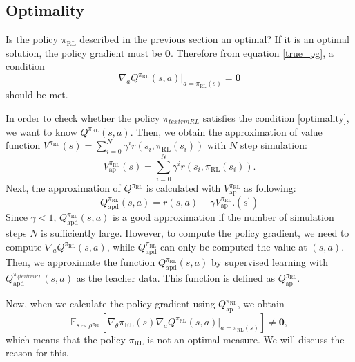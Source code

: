 \documentclass[english, dvipdfmx]{ampmt}             %
\newcommand{\expect}{\mathbb{E}}
\begin{document}
\subsection{Optimality}
Is the policy $\pi_{\textrm{RL}}$ described in the previous section an optimal? If it is an optimal solution, the policy gradient must be $\bm{0}$. Therefore from equation \eqref{true_pg}, a condition
\begin{equation}
	\nabla_a Q^{\pi_{\textrm{RL}}}(s,a)|_{a=\pi_{\textrm{RL}}(s)} = \bm{0}
\end{equation}
should be met. \par
In order to check whether the policy $\pi_{textrm{RL}}$ satisfies the condition \eqref{optimality}, we want to know $Q^{\pi_{\textrm{RL}}}(s,a)$. Then, we obtain the approximation of value function $V^{\pi_{\textrm{RL}}}(s) = \sum_{i=0}^{N}\gamma^i r(s_i,\pi_{\textrm{RL}}(s_i))$ with $N$ step simulation:
\begin{equation}
	V^{\pi_{\textrm{RL}}}_{\textrm{ap}}(s) = \sum_{i=0}^{N}\gamma^i r(s_i,\pi_{\textrm{RL}}(s_i)).
\end{equation}
Next, the approximation of $Q^{\pi_{\textrm{RL}}}$ is calculated with $V^{\pi_{\textrm{RL}}}_{\textrm{ap}}$ as following:
\begin{equation}
	Q^{\pi_{\textrm{RL}}}_{\textrm{apd}}(s,a) = r(s,a) + \gamma V^{\pi_{\textrm{RL}}}_{\textrm{ap}}.(s^{\prime})
\end{equation}
Since $\gamma < 1$, $Q^{\pi_{\textrm{RL}}}_{\textrm{apd}}(s,a)$ is a good approximation if the number of simulation steps $N$ is sufficiently large. However, to compute the policy gradient, we need to compute $\nabla_{a}Q^{\pi_{\textrm{RL}}}(s, a)$, while $Q^{\pi_{\textrm{RL}}}_{\textrm{apd}}$ can only be computed the value at $(s,a)$. Then, we approximate the function $Q^{\pi_{\textrm{RL}}}_{\textrm{apd}}(s,a)$ by supervised learning with $Q^{\pi_{\{textrm{RL}}}_{\textrm{apd}}(s,a)$ as the teacher data. This function is defined as $Q^{\pi_{\textrm{RL}}}_{\textrm{ap}}$.\par
Now, when we calculate the policy gradient using $Q^{\pi_{\textrm{RL}}}_{\textrm{ap}}$, we obtain
\begin{equation}
	\expect_{s\sim\rho^{\pi_{\textrm{RL}}}}[
	\nabla_{\theta}\pi_{\textrm{RL}}(s)\nabla_{a}Q^{\pi_{\textrm{RL}}}(s, a)|_{a=\pi_{\textrm{RL}}(s)}] \neq \bm{0}, 
\end{equation}
which means that the policy $\pi_{\textrm{RL}}$ is not an optimal measure. We will discuss the reason for this.
\end{document}
